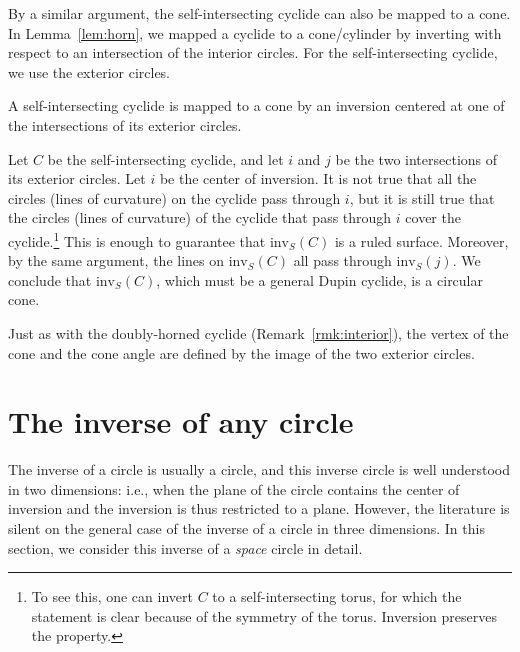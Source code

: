 By a similar argument, the self-intersecting cyclide can also 
be mapped to a cone.
In Lemma~\ref{lem:horn}, we mapped a cyclide to a cone/cylinder
by inverting with respect to an intersection of the interior circles.
For the self-intersecting cyclide, we use the exterior circles.

\begin{lemma}
A self-intersecting cyclide is mapped to a cone by an inversion centered
at one of the intersections of its exterior circles.
\end{lemma}
Let $C$ be the self-intersecting cyclide, 
and let $i$ and $j$ be the two intersections of its exterior circles.
Let $i$ be the center of inversion.
It is not true that all the circles (lines of curvature)
on the cyclide pass through $i$,
but it is still true that the circles
(lines of curvature) of the cyclide that pass through $i$ cover the 
cyclide.\footnote{To see this, one can invert $C$
	to a self-intersecting torus, for which the statement is clear
	because of the symmetry of the torus.  
	Inversion preserves the property.}
This is enough to guarantee that $\mbox{inv}_{S}(C)$ is a ruled surface.
Moreover, by the same argument, 
the lines on $\mbox{inv}_{S}(C)$ all pass through 
$\mbox{inv}_{S}(j)$.
We conclude that $\mbox{inv}_{S}(C)$, which must be a general Dupin cyclide,
is a circular cone.
\QED

\begin{rmk}
Just as with the doubly-horned cyclide (Remark~\ref{rmk:interior}),
the vertex of the cone and the cone angle are defined by the image
of the two exterior circles.
\end{rmk}


% 

\section{The inverse of any circle}
\label{sec1}

The inverse of a circle is usually a circle, and this
inverse circle is well understood in two dimensions: i.e., 
when the plane of the circle contains the center of inversion and
the inversion is thus restricted to a plane.
However, the literature is silent on the general case of the
inverse of a circle in three dimensions.
In this section, we consider this inverse of a {\em space} circle in detail.

